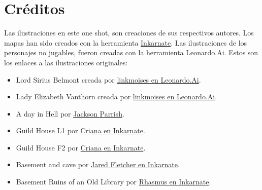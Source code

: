 \documentclass[10pt,twoside,twocolumn,openany]{dndbook}
\begin{document}
\section{Créditos}

Las ilustraciones en este one shot, son creaciones de sus respectivos autores. Los mapas han sido 
creados con la herramienta \href{https://inkarnate.com/}{Inkarnate}. Las ilustraciones de los 
personajes no jugables, fueron creadas con la herramienta Leonardo.Ai. Estos son los enlaces a las 
ilustraciones originales:

\begin{itemize}
  \item Lord Sirius Belmont creada por \href{https://cdn.leonardo.ai/users/898407a5-5b36-4dae-87cc-c51a8041e826/generations/8ac651a0-9be3-4896-85f0-2ce0d8e01215/DreamShaper_v7_dungeon_and_dragons_style_illustration_charisma_1.jpg}{linkmoises en Leonardo.Ai}.
  \item Lady Elizabeth Vanthorn creada por \href{https://cdn.leonardo.ai/users/898407a5-5b36-4dae-87cc-c51a8041e826/generations/a5c78c2e-61f0-478a-8005-03b46068bcdc/DreamShaper_v7_dungeon_and_dragons_style_illustration_charisma_1.jpg}{linkmoises en Leonardo.Ai}.
  \item A day in Hell por \href{https://licensing.pixels.com/featured/a-day-in-hell-jackson-parrish.html}{Jackson Parrish}.
  \item Guild House L1 por \href{https://inkarnate.com/p/RVAA0X-criana/maps/79j1zW-guild-house/}{Criana en Inkarnate}.
  \item Guild House F2 por \href{https://inkarnate.com/p/RVAA0X-criana/maps/lZznw8-guild-house-f2/}{Criana en Inkarnate}.
  \item Basement and cave por \href{https://inkarnate.com/p/49vmYo-jared-fletcher/maps/kdGk9r-basement-and-cave/}{Jared Fletcher en Inkarnate}.
  \item Basement Ruins of an Old Library por \href{https://inkarnate.com/p/R1zAY7-rhasmus/maps/lJ1wxd-day-89-365-basement-ruins-of-an-old-library/}{Rhasmus en Inkarnate}.
\end{itemize}
\end{document}
